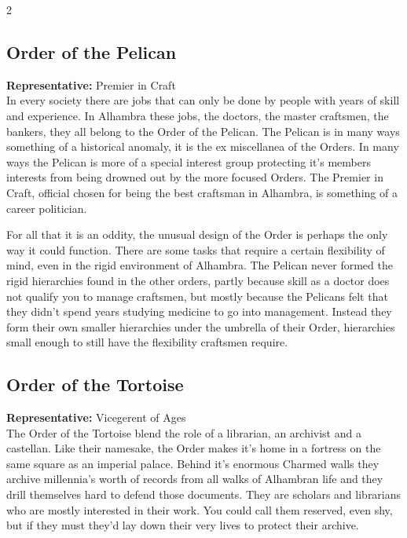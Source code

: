 \begin{multicols}{2}
\subsection*{Order of the Pelican}

\textbf{Representative:} Premier in Craft\\

\noindent In every society there are jobs that can only be done by people with years of skill and experience. In Alhambra these jobs, the doctors, the master craftsmen, the bankers, they all belong to the Order of the Pelican. The Pelican is in many ways something of a historical anomaly, it is the ex miscellanea of the Orders. In many ways the Pelican is more of a special interest group protecting it's members interests from being drowned out by the more focused Orders. The Premier in Craft, official chosen for being the best craftsman in Alhambra, is something of a career politician. 

For all that it is an oddity, the unusual design of the Order is perhaps the only way it could function. There are some tasks that require a certain flexibility of mind, even in the rigid environment of Alhambra. The Pelican never formed the rigid hierarchies found in the other orders, partly because skill as a doctor does not qualify you to manage craftsmen, but mostly because the Pelicans felt that they didn't spend years studying medicine to go into management. Instead they form their own smaller hierarchies under the umbrella of their Order, hierarchies small enough to still have the flexibility craftsmen require. 

\subsection*{Order of the Tortoise}

\textbf{Representative:} Vicegerent of Ages\\

\noindent The Order of the Tortoise blend the role of a librarian, an archivist and a castellan. Like their namesake, the Order makes it's home in a fortress on the same square as an imperial palace. Behind it's enormous Charmed walls they archive millennia's worth of records from all walks of Alhambran life and they drill themselves hard to defend those documents. They are scholars and librarians who are mostly interested in their work. You could call them reserved, even shy, but if they must they'd lay down their very lives to protect their archive.


\end{multicols}
